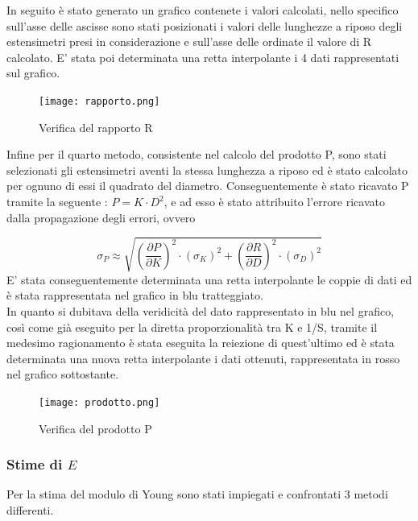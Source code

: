 \documentclass[a4paper,11pt,oneside]{article}
\begin{document}
In seguito è stato generato un grafico contenete i valori calcolati, nello specifico sull'asse delle ascisse sono stati posizionati i valori delle lunghezze a riposo degli estensimetri presi in considerazione e sull'asse delle ordinate il valore di R calcolato. E' stata poi determinata una retta interpolante i 4 dati rappresentati sul grafico.


\begin{figure}[h!]
    \centering

        \label{fig:a_lunghezza_cost}
        \texttt{[image: rapporto.png]}
        \caption{Verifica del rapporto R}
\end{figure}
Infine per il quarto metodo, consistente nel calcolo del prodotto P, sono stati selezionati gli estensimetri aventi la stessa lunghezza a riposo ed è stato calcolato per ognuno di essi il quadrato del diametro. Conseguentemente è stato ricavato P tramite la seguente : $P= K \cdot D^2 $, e ad esso è stato attribuito l'errore  ricavato dalla propagazione degli errori, ovvero 

\begin{equation*}
    \sigma_P \approx \sqrt{\left ( \frac{\partial P }{\partial K} \right )^2 \cdot \left ( \sigma_K \right )^2 + \left ( \frac{\partial R }{\partial D} \right )^2 \cdot \left ( \sigma_D \right )^2 }
\end{equation*}
E' stata conseguentemente determinata una retta interpolante le coppie di dati ed è stata rappresentata nel grafico in blu tratteggiato.\\
In quanto si dubitava della veridicità del dato rappresentato in blu nel grafico, così come già eseguito per la diretta proporzionalità tra K e 1/S, tramite il medesimo ragionamento è stata eseguita la reiezione di quest'ultimo ed è stata determinata una nuova retta interpolante i dati ottenuti, rappresentata in rosso nel grafico sottostante.

\begin{figure}[h!]
    \centering
    
        \label{fig:a_lunghezza_cost}
        \texttt{[image: prodotto.png]}
        \caption{Verifica del prodotto P}
\end{figure}

\subsubsection*{Stime di $E$}
Per la stima del modulo di Young sono stati impiegati e confrontati 3 metodi differenti.
\end{document}
